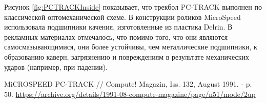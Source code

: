 \documentclass[11pt, a4paper]{article}
\begin{document}
Рисунок \ref{fig:PCTRACKInside} показывает, что трекбол PC-TRACK выполнен по классической оптомеханической схеме. В конструкции роликов MicroSpeed использовала подшипники качения, изготовленные из пластика Delrin. В рекламных материалах отмечалось, что помимо того, что они являются самосмазывающимися, они более устойчивы, чем металлические подшипники, к образованию каверн, загрязнению и повреждениям в результате механических ударов (например, при падении).

\begin{thebibliography}{9}
 MiCROSPEED PC-TRACK // Compute! Magazin,  Iss. 132, August 1991. - p. 50. \url{https://archive.org/details/1991-08-compute-magazine/page/n51/mode/2up}
\end{thebibliography}
\end{document}
